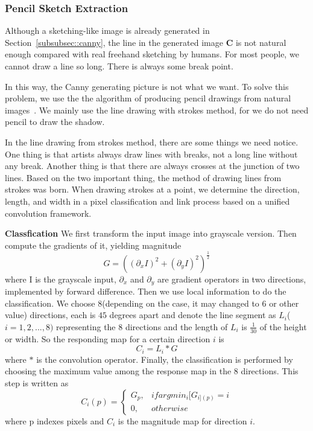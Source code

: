 \documentclass[10pt,twocolumn,letterpaper]{article}
\begin{document}
\subsubsection{Pencil Sketch Extraction}
Although a sketching-like image is already generated in Section~\ref{subsubsec::canny}, the line in the generated image $\mathbf{C}$ is not natural enough compared with real freehand sketching by humans. For most people, we cannot draw a line so long. There is always some break point.

In this way, the Canny generating picture is not what we want. To solve this problem, we use the the algorithm of producing pencil drawings from natural images~\cite{lu2012combining}. We mainly use the line drawing with strokes method, for we do not need pencil to draw the shadow.

In the line drawing from strokes method, there are some things we need notice. One thing is that artists always draw lines with breaks, not a long line without any break. Another thing is that there are always crosses at the junction of two lines.
Based on the two important thing, the method of drawing lines from strokes was born. When drawing strokes at a point, we determine the direction, length, and width in a pixel classification and link process based on a unified convolution framework.

\textbf{Classfication} We first transform the input image into grayscale version. Then compute the gradients of it, yielding magnitude
	\begin{equation}
	G = ((\partial_{x}I)^{2} + (\partial_{y}I)^{2})^{\frac{1}{2}}
	\end{equation}
where I is the grayscale input, $\partial_{x}$ and $\partial_{y}$ are gradient operators in two directions, implemented by forward difference. Then we use local information to do the classification. We choose $8$(depending on the case, it may changed to $6$ or other value) directions, each is $45$ degrees apart and denote the line segment as $L_{i}$($i = 1, 2, ... , 8)$ representing the $8$ directions and the length of $L_{i}$ is $\frac{1}{30}$ of the height or width. So the responding map for a certain direction $i$ is
	\begin{equation}
	C_{i} = L_{i} * G
	\end{equation}
where $*$ is the convolution operator. Finally, the classification is performed by choosing the maximum value among the response map in the $8$ directions. This step is written as
	\begin{equation}
		C_{i}(p) = \left\{
             \begin{array}{lr}
             G_{p}, &  if argmin_{i}[G_{i](p)} = i \\
             0, & otherwise
             \end{array}
\right.
\end{equation}
where p indexes pixels and $C_{i}$ is the magnitude map for direction $i$.
\end{document}
